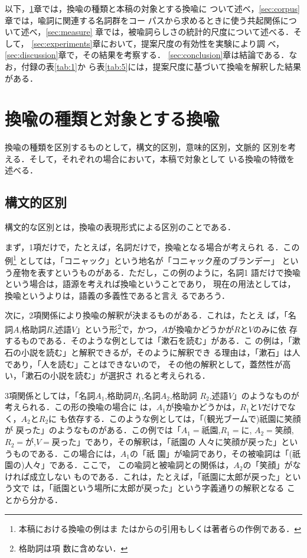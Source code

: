 以下，\ref{sec:sort}章では，換喩の種類と本稿の対象とする換喩に
ついて述べ，\ref{sec:corpus}章では，喩詞に関連する名詞群をコー
パスから求めるときに使う共起関係について述べ，\ref{sec:measure}
章では，被喩詞らしさの統計的尺度について述べる．そして，
\ref{sec:experiments}章において，提案尺度の有効性を実験により調
べ，\ref{sec:discussion}章で，その結果を考察する．
\ref{sec:conclusion}章は結論である．なお，付録の表\ref{tab:1}か
ら表\ref{tab:5}には，提案尺度に基づいて換喩を解釈した結果がある．

\section{換喩の種類と対象とする換喩}
\label{sec:sort}

換喩の種類を区別するものとして，構文的区別，意味的区別，文脈的
区別を考える．そして，それぞれの場合において，本稿で対象として
いる換喩の特徴を述べる．

\subsection{構文的区別}
\label{sec:syntax}

構文的な区別とは，換喩の表現形式による区別のことである．

まず，1項だけで，たとえば，名詞だけで，換喩となる場合が考えられ
る．この例\footnote{本稿における換喩の例は\cite{yamanashi88}ま
  たは\cite{yamamoto98}からの引用もしくは著者らの作例である．}
としては，「コニャック」という地名が「コニャック産のブランデー」
という産物を表すというものがある．ただし，この例のように，名詞1
語だけで換喩という場合は，語源を考えれば換喩ということであり，
現在の用法としては，換喩というよりは，語義の多義性であると言え
るであろう．

次に，2項関係により換喩の解釈が決まるものがある．これは，たとえ
ば，「名詞$A$,格助詞$R$,述語$V$」という形\footnote{格助詞は項
  数に含めない．}で，かつ，$A$が換喩かどうかが$R$と$V$のみに依
存するものである．そのような例としては「漱石を読む」がある．こ
の例は，「漱石の小説を読む」と解釈できるが，そのように解釈でき
る理由は，「漱石」は人であり，「人を読む」ことはできないので，
その他の解釈として，蓋然性が高い，「漱石の小説を読む」が選択さ
れると考えられる．

3項関係としては，「名詞$A_1$,格助詞$R_1$,名詞$A_2$,格助詞
$R_2$,述語$V$」のようなものが考えられる．この形の換喩の場合に
は，$A_1$が換喩かどうかは，$R_1$と$V$だけでなく，$A_2$と$R_2$に
も依存する．このような例としては，「(観光ブームで)祇園に笑顔が
戻った」のようなものがある．この例では「$A_1=祇園$,$R_1=に$,
$A_2=笑顔$,$R_2=が$,$V=戻った$」であり，その解釈は，「祇園の
人々に笑顔が戻った」というものである．この場合には，$A_1$の「祇
園」が喩詞であり，その被喩詞は「(祇園の)人々」である．ここで，
この喩詞と被喩詞との関係は，$A_2$の「笑顔」がなければ成立しない
ものである．これは，たとえば，「祇園に太郎が戻った」という文で
は，「祇園という場所に太郎が戻った」という字義通りの解釈となる
ことから分かる．

